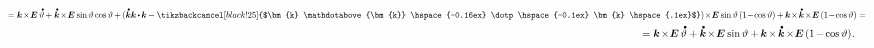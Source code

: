 \begin{otherlanguage}{russian}
\begin{multline*}
%
\scalebox{0.78}[0.82]{$= \bm{k} \hspace{-0.24ex}\times\hspace{-0.4ex} \bm{E} \hspace{.4ex} \mathdotabove{\vartheta} \hspace{-0.1ex}
+ \mathdotabove{\bm{k}} \hspace{-0.24ex}\times\hspace{-0.4ex} \bm{E} \hspace{.1ex} \operatorname{sin} \vartheta \operatorname{cos} \vartheta \hspace{-0.1ex}
+ \hspace{-0.16ex} ( \mathdotabove{\bm{k}} \bm{k} \hspace{-0.1ex} \dotp \hspace{-0.16ex} \bm{k} \hspace{-0.1ex} - \tikzbackcancel[black!25]{$\bm{k} \mathdotabove{\bm{k}} \hspace{-0.16ex} \dotp \hspace{-0.1ex} \bm{k} \hspace{.1ex}$} ) \hspace{-0.4ex}\times\hspace{-0.4ex} \bm{E} \hspace{.1ex} \operatorname{sin} \vartheta \left({1 \!-\! \operatorname{cos} \vartheta}\right) \hspace{-0.1ex}
+ \hspace{-0.1ex} \bm{k} \hspace{-0.32ex}\times\hspace{-0.25ex}  \mathdotabove{\bm{k}} \hspace{-0.25ex}\times\hspace{-0.42ex} \bm{E} \hspace{.32ex} ({1 \!-\! \operatorname{cos} \vartheta}) = $} \\
%
\shoveright{\hfill \hspace{11.2em}\scalebox{.96}[.96]{$= \bm{k} \hspace{-0.24ex}\times\hspace{-0.4ex} \bm{E} \hspace{.4ex} \mathdotabove{\vartheta}
+ \mathdotabove{\bm{k}} \hspace{-0.24ex}\times\hspace{-0.4ex} \bm{E} \hspace{.1ex} \operatorname{sin} \vartheta
+ \hspace{-0.1ex} \bm{k} \hspace{-0.2ex}\times\hspace{-0.2ex}  \mathdotabove{\bm{k}} \hspace{-0.2ex}\times\hspace{-0.4ex} \bm{E} \hspace{.32ex} ({1 \hspace{-0.2ex} - \hspace{-0.2ex} \operatorname{cos} \vartheta}) \hspace{.1ex}.
$}}
\end{multline*}


\end{otherlanguage}
